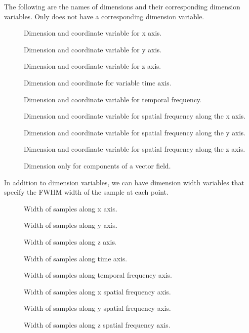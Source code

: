 \documentclass{article}
\begin{document}
The following are the names of dimensions and their corresponding
dimension variables. Only  does not have a
corresponding dimension variable.
\begin{description}
   \item [] Dimension and coordinate variable for x axis.
   \item [] Dimension and coordinate variable for y axis.
   \item [] Dimension and coordinate variable for z axis.
   \item [] Dimension and coordinate for variable time axis.
   \item [] Dimension and coordinate variable for
      temporal frequency.
   \item [] Dimension and coordinate variable for spatial 
      frequency along the x axis.
   \item [] Dimension and coordinate variable for spatial
      frequency along the y axis.
   \item [] Dimension and coordinate variable for spatial
      frequency along the z axis.
   \item [] Dimension only for components of
      a vector field.
\end{description}

In addition to dimension variables, we can have dimension width
variables that specify the FWHM width of the sample at each point.
\begin{description}
   \item [] Width of samples along x axis.
   \item [] Width of samples along y axis.
   \item [] Width of samples along z axis.
   \item [] Width of samples along time axis.
   \item [] Width of samples along temporal
      frequency axis.
   \item [] Width of samples along x spatial
      frequency axis.
   \item [] Width of samples along y spatial
      frequency axis.
   \item [] Width of samples along z spatial
      frequency axis.
\end{description}
\end{document}
